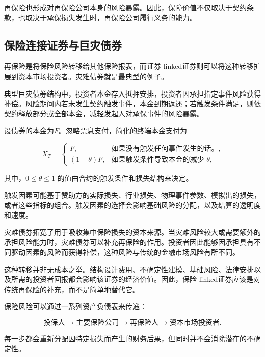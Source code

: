 再保险也形成对再保险公司本身的风险暴露。因此，保障价值不仅取决于契约条款，也取决于承保损失发生时，再保险公司履行义务的能力。


\subsection{保险连接证券与巨灾债券}

再保险是将保险风险转移给其他保险报表，而证券-linked证券则可以将这种转移扩展到资本市场投资者。灾难债券就是最典型的例子。

典型巨灾债券结构中，投资者本金存入抵押安排，投资者因承担指定事件风险获得补偿。风险期间内若未发生契约触发事件，本金到期返还；若触发条件满足，则依契约释放部分或全部本金，减轻发起人对承保事件的风险暴露。

设债券的本金为$F$。忽略票息支付，简化的终端本金支付为

\begin{equation}
X_T=
\begin{cases}
F, & \text{如果没有触发任何事件发生的话。},\\
(1-\theta)F, & \text{如果触发条件导致本金的减少 } \theta,
\end{cases}
\label{eq:ch15-cat-bond-payoff}
\end{equation}

其中，$0\leq\theta\leq1$ 的值由合约的触发条件和损失结构来决定。

触发因素可能基于赞助方的实际损失、行业损失、物理事件参数、模拟出的损失，或者这些指标的组合。触发因素的选择会影响基础风险的分配，以及结算的透明度和速度。

灾难债券拓宽了用于吸收集中保险损失的资本来源。当灾难风险较大或需要额外的承担风险能力时，灾难债券可以补充再保险的作用。投资者因此能够因承担具有不同驱动因素的风险而获得补偿，这种风险与传统的金融市场风险有所不同。

这种转移并非无成本之举。结构设计费用、不确定性建模、基础风险、法律安排以及所需的投资者回报都会影响该证券的经济价值。因此，保险-linked证券应该是对传统再保险的补充，而不是简单地替代它。

\begin{tcolorbox}[
enhanced,
breakable,
colback=white,
colframe=FinanceBlue,
boxrule=0.7pt,
sharp corners,
borderline west={2.2pt}{0pt}{FinanceBlue},
title=\textbf{财务展望：将风险转移扩展到保险资产负债表之外},
coltitle=white,
colbacktitle=FinanceBlue,
fonttitle=\bfseries,
before skip=1.2em,
after skip=1.2em
]

保险风险可以通过一系列资产负债表来传递：

$$
\text{投保人}
\rightarrow
\text{主要保险公司}
\rightarrow
\text{再保险人}
\rightarrow
\text{资本市场投资者}.
$$

每一步都会重新分配因特定损失而产生的财务后果，但同时并不会消除潜在的不确定性。

\end{tcolorbox}


